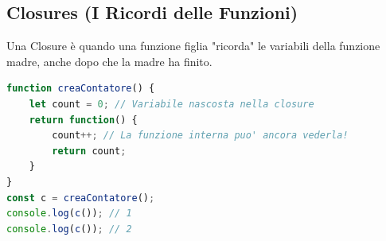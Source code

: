 \subsection{Closures (I Ricordi delle Funzioni)}
Una Closure è quando una funzione figlia "ricorda" le variabili della funzione madre, anche dopo che la madre ha finito.

\begin{lstlisting}[language=JavaScript]
function creaContatore() {
    let count = 0; // Variabile nascosta nella closure
    return function() {
        count++; // La funzione interna puo' ancora vederla!
        return count;
    }
}
const c = creaContatore();
console.log(c()); // 1
console.log(c()); // 2
\end{lstlisting}
